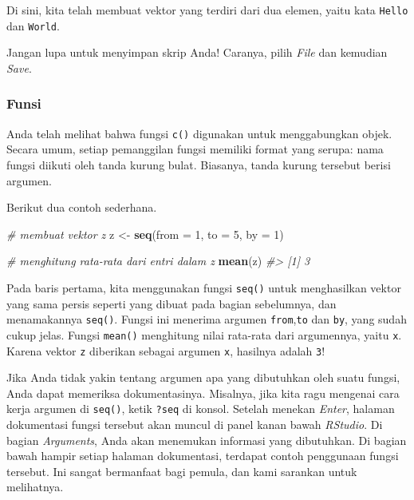 \documentclass[
  oneside]{book}
\newenvironment{Shaded}{\begin{snugshade}}{\end{snugshade}}
\newcommand{\AttributeTok}[1]{\textcolor[rgb]{0.13,0.29,0.53}{#1}}
\newcommand{\CommentTok}[1]{\textcolor[rgb]{0.56,0.35,0.01}{\textit{#1}}}
\newcommand{\DecValTok}[1]{\textcolor[rgb]{0.00,0.00,0.81}{#1}}
\newcommand{\FunctionTok}[1]{\textcolor[rgb]{0.13,0.29,0.53}{\textbf{#1}}}
\newcommand{\NormalTok}[1]{#1}
\newcommand{\OtherTok}[1]{\textcolor[rgb]{0.56,0.35,0.01}{#1}}
\begin{document}
Di sini, kita telah membuat vektor yang terdiri dari dua elemen, yaitu kata \texttt{Hello} dan \texttt{World}.

Jangan lupa untuk menyimpan skrip Anda! Caranya, pilih \emph{File} dan kemudian \emph{Save}.

\subsubsection*{Funsi}\label{funsi}

Anda telah melihat bahwa fungsi \texttt{c()} digunakan untuk menggabungkan objek. Secara umum, setiap pemanggilan fungsi memiliki format yang serupa: nama fungsi diikuti oleh tanda kurung bulat. Biasanya, tanda kurung tersebut berisi argumen.

Berikut dua contoh sederhana.

\begin{Shaded}
\begin{Highlighting}[]
\CommentTok{\# membuat vektor \textasciigrave{}z\textasciigrave{}}
\NormalTok{z }\OtherTok{\textless{}{-}} \FunctionTok{seq}\NormalTok{(}\AttributeTok{from =} \DecValTok{1}\NormalTok{, }\AttributeTok{to =} \DecValTok{5}\NormalTok{, }\AttributeTok{by =} \DecValTok{1}\NormalTok{)}

\CommentTok{\# menghitung rata{-}rata dari entri dalam \textasciigrave{}z\textasciigrave{}}
\FunctionTok{mean}\NormalTok{(z)}
\CommentTok{\#\textgreater{} [1] 3}
\end{Highlighting}
\end{Shaded}

Pada baris pertama, kita menggunakan fungsi \texttt{seq()} untuk menghasilkan vektor yang sama persis seperti yang dibuat pada bagian sebelumnya, dan menamakannya \texttt{seq()}. Fungsi ini menerima argumen \texttt{from},\texttt{to} dan \texttt{by}, yang sudah cukup jelas. Fungsi \texttt{mean()} menghitung nilai rata-rata dari argumennya, yaitu \texttt{x}. Karena vektor \texttt{z} diberikan sebagai argumen \texttt{x}, hasilnya adalah \texttt{3}!

Jika Anda tidak yakin tentang argumen apa yang dibutuhkan oleh suatu fungsi, Anda dapat memeriksa dokumentasinya. Misalnya, jika kita ragu mengenai cara kerja argumen di \texttt{seq()}, ketik \texttt{?seq} di konsol. Setelah menekan \emph{Enter}, halaman dokumentasi fungsi tersebut akan muncul di panel kanan bawah \emph{RStudio}. Di bagian \emph{Arguments}, Anda akan menemukan informasi yang dibutuhkan. Di bagian bawah hampir setiap halaman dokumentasi, terdapat contoh penggunaan fungsi tersebut. Ini sangat bermanfaat bagi pemula, dan kami sarankan untuk melihatnya.
\end{document}
